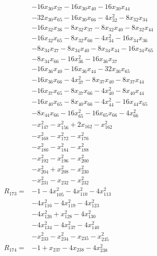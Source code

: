\begin{align*}
&-16x_{30}x_{37} -16x_{30}x_{40} -16x_{30}x_{44}\\
&-32x_{30}x_{65} -16x_{30}x_{66} -4x_{32}^{2} -8x_{32}x_{34}\\
&-16x_{32}x_{36} -8x_{32}x_{37} -8x_{32}x_{40} -8x_{32}x_{44}\\
&-16x_{32}x_{65} -8x_{32}x_{66} -4x_{34}^{2} -16x_{34}x_{36}\\
&-8x_{34}x_{37} -8x_{34}x_{40} -8x_{34}x_{44} -16x_{34}x_{65}\\
&-8x_{34}x_{66} -16x_{36}^{2} -16x_{36}x_{37}\\
&-16x_{36}x_{40} -16x_{36}x_{44} -32x_{36}x_{65}\\
&-16x_{36}x_{66} -4x_{37}^{2} -8x_{37}x_{40} -8x_{37}x_{44}\\
&-16x_{37}x_{65} -8x_{37}x_{66} -4x_{40}^{2} -8x_{40}x_{44}\\
&-16x_{40}x_{65} -8x_{40}x_{66} -4x_{44}^{2} -16x_{44}x_{65}\\
&-8x_{44}x_{66} -16x_{65}^{2} -16x_{65}x_{66} -4x_{66}^{2}\\
&-x_{147}^{2} -x_{156}^{2} +2x_{162} -x_{162}^{2}\\
&-x_{168}^{2} -x_{172}^{2} -x_{176}^{2}\\
&-x_{180}^{2} -x_{184}^{2} -x_{188}^{2}\\
&-x_{192}^{2} -x_{196}^{2} -x_{200}^{2}\\
&-x_{204}^{2} +x_{208}^{2} -x_{230}^{2}\\
&-x_{231}^{2} -x_{232} -x_{232}^{2}\\[3pt]
R_{173}={}&-1 -4x_{105}^{2} -4x_{110}^{2} -4x_{113}^{2}\\
&-4x_{116}^{2} -4x_{119}^{2} -4x_{123}^{2}\\
&-4x_{126}^{2} +x_{128}^{2} -4x_{130}^{2}\\
&-4x_{134}^{2} -4x_{137}^{2} -4x_{140}^{2}\\
&-x_{233}^{2} -x_{234}^{2} -x_{235} -x_{235}^{2}\\[3pt]
R_{174}={}&-1 +x_{237} -4x_{238} -4x_{238}^{2}\\[3pt]
\end{align*}
